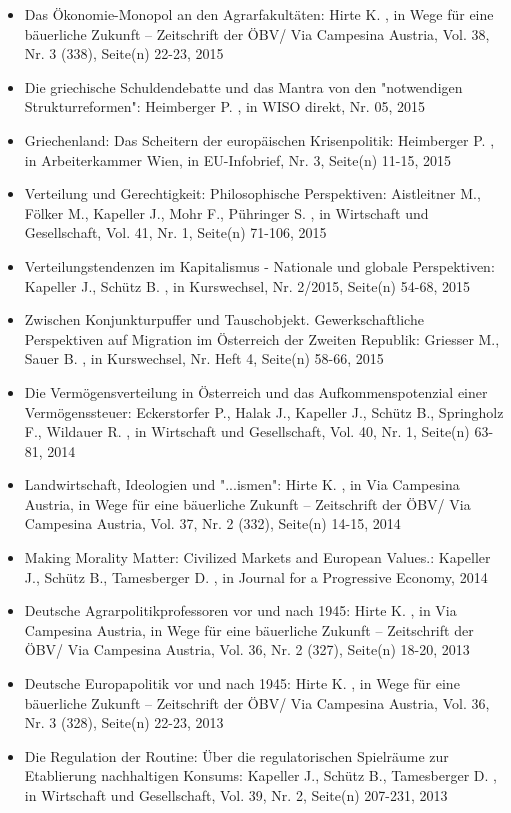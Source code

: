 \begin{itemize}
\item Das Ökonomie-Monopol an den Agrarfakultäten: Hirte K. , in Wege für eine bäuerliche Zukunft – Zeitschrift der ÖBV/ Via Campesina Austria, Vol. 38, Nr. 3 (338), Seite(n) 22-23, 2015
\item Die griechische Schuldendebatte und das Mantra von den "notwendigen Strukturreformen": Heimberger P. , in WISO direkt, Nr. 05, 2015
\item Griechenland: Das Scheitern der europäischen Krisenpolitik: Heimberger P. , in Arbeiterkammer Wien, in EU-Infobrief, Nr. 3, Seite(n) 11-15, 2015
\item Verteilung und Gerechtigkeit: Philosophische  Perspektiven: Aistleitner M., Fölker M., Kapeller J., Mohr F., Pühringer S. , in Wirtschaft und Gesellschaft, Vol. 41, Nr. 1, Seite(n) 71-106, 2015
\item Verteilungstendenzen im Kapitalismus - Nationale und globale Perspektiven: Kapeller J., Schütz B. , in Kurswechsel, Nr. 2/2015, Seite(n) 54-68, 2015
\item Zwischen Konjunkturpuffer und Tauschobjekt. Gewerkschaftliche Perspektiven auf Migration im Österreich der Zweiten Republik: Griesser M., Sauer B. , in Kurswechsel, Nr. Heft 4, Seite(n) 58-66, 2015
\item Die Vermögensverteilung in Österreich und das Aufkommenspotenzial einer Vermögenssteuer: Eckerstorfer P., Halak J., Kapeller J., Schütz B., Springholz F., Wildauer R. , in Wirtschaft und Gesellschaft, Vol. 40, Nr. 1, Seite(n) 63-81, 2014
\item Landwirtschaft, Ideologien und "...ismen": Hirte K. , in Via Campesina Austria, in Wege für eine bäuerliche Zukunft – Zeitschrift der ÖBV/ Via Campesina Austria, Vol. 37, Nr. 2 (332), Seite(n) 14-15, 2014
\item Making Morality Matter: Civilized Markets and European Values.: Kapeller J., Schütz B., Tamesberger D. , in Journal for a Progressive Economy, 2014
\item Deutsche Agrarpolitikprofessoren vor und nach 1945: Hirte K. , in Via Campesina Austria, in Wege für eine bäuerliche Zukunft – Zeitschrift der ÖBV/ Via Campesina Austria, Vol. 36, Nr. 2 (327), Seite(n) 18-20, 2013
\item Deutsche Europapolitik vor und nach 1945: Hirte K. , in Wege für eine bäuerliche Zukunft – Zeitschrift der ÖBV/ Via Campesina Austria, Vol. 36, Nr. 3 (328), Seite(n) 22-23, 2013
\item Die Regulation der Routine: Über die regulatorischen Spielräume zur Etablierung nachhaltigen Konsums: Kapeller J., Schütz B., Tamesberger D. , in Wirtschaft und Gesellschaft, Vol. 39, Nr. 2, Seite(n) 207-231, 2013

\end{itemize}
